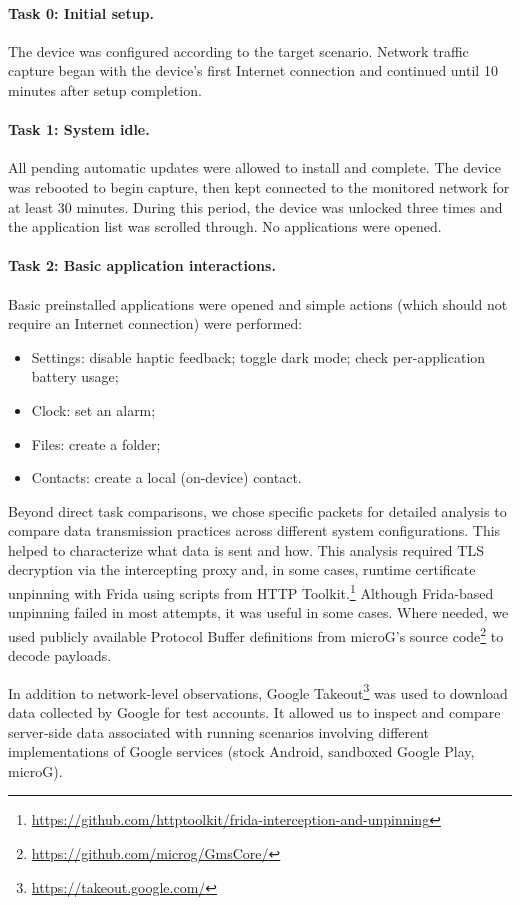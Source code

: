 \paragraph{Task 0: Initial setup.}
The device was configured according to the target scenario. Network traffic capture began with the device's first Internet connection and continued until 10 minutes after setup completion.

\paragraph{Task 1: System idle.}
All pending automatic updates were allowed to install and complete. The device was rebooted to begin capture, then kept connected to the monitored network for at least 30 minutes. During this period, the device was unlocked three times and the application list was scrolled through. No applications were opened.

\paragraph{Task 2: Basic application interactions.}
Basic preinstalled applications were opened and simple actions (which should not require an Internet connection) were performed:
\begin{itemize}
	\item Settings: disable haptic feedback; toggle dark mode; check per-application battery usage;
	\item Clock: set an alarm;
	\item Files: create a folder;
	\item Contacts: create a local (on-device) contact.
\end{itemize}

Beyond direct task comparisons, we chose specific packets for detailed analysis to compare data transmission practices across different system configurations. This helped to characterize what data is sent and how. This analysis required TLS decryption via the intercepting proxy and, in some cases, runtime certificate unpinning with Frida using scripts from HTTP Toolkit.\footnote{\url{https://github.com/httptoolkit/frida-interception-and-unpinning}} Although Frida-based unpinning failed in most attempts, it was useful in some cases. Where needed, we used publicly available Protocol Buffer definitions from microG's source code\footnote{\url{https://github.com/microg/GmsCore/}} to decode payloads.

In addition to network-level observations, Google Takeout\footnote{\url{https://takeout.google.com/}} was used to download data collected by Google for test accounts. It allowed us to inspect and compare server-side data associated with running scenarios involving different implementations of Google services (stock Android, sandboxed Google Play, microG).